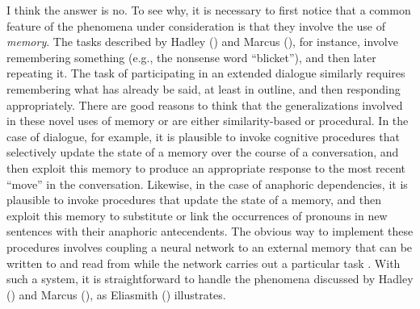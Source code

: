 I think the answer is no. To see why, it is necessary to first notice that a common feature of the phenomena under consideration is that they involve the use of \textit{memory}. The tasks described by Hadley (\citeyear{Hadley:2009}) and Marcus (\citeyear{Marcus:1998}), for instance, involve remembering something (e.g., the nonsense word ``blicket''), and then later repeating it. The task of participating in an extended dialogue similarly requires remembering what has already be said, at least in outline, and then responding appropriately. There are good reasons to think that the generalizations involved in these novel uses of memory or are either similarity-based or procedural. In the case of dialogue, for example, it is plausible to invoke cognitive procedures that selectively update the state of a memory over the course of a conversation, and then exploit this memory to produce an appropriate response to the most recent ``move'' in the conversation. Likewise, in the case of anaphoric dependencies, it is plausible to invoke procedures that update the state of a memory, and then exploit this memory to substitute or link the occurrences of pronouns in new sentences with their anaphoric antecendents. The obvious way to implement these procedures involves coupling a neural network to an external memory that can be written to and read from while the network carries out a particular task \citep{Weston:2016,Weston:2015,Sukhbataar:2015,Eliasmith:2012,Graves:2014}. With such a system, it is straightforward to handle the phenomena discussed by Hadley (\citeyear{Hadley:2009}) and Marcus (\citeyear{Marcus:1998}), as Eliasmith (\citeyear{Eliasmith:2013}) illustrates. 

